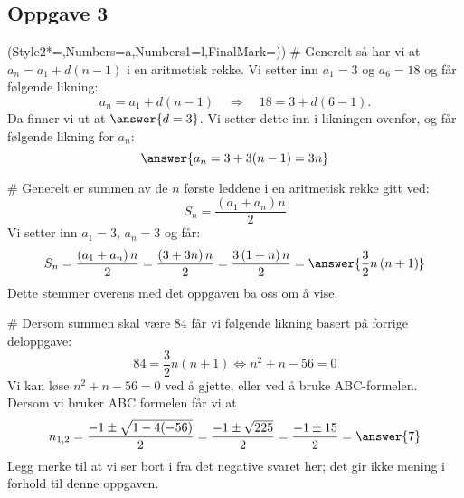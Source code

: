 \subsection*{Oppgave 3}
\begin{easylist}[enumerate]
	\ListProperties(Style2*=,Numbers=a,Numbers1=l,FinalMark={)})
	# Generelt så har vi at $a_n = a_1 + d(n-1)$ i en aritmetisk rekke. Vi setter inn $a_1 = 3$ og $a_6 = 18$ og
	får følgende likning:
	\begin{equation*}
		a_n = a_1 + d(n-1) \quad \Rightarrow \quad 18 = 3 + d(6-1).
	\end{equation*}
	Da finner vi ut at $\answer{d = 3}$. Vi setter dette inn i likningen ovenfor, og får følgende likning for $a_n$:
	\begin{equation*}
		\answer{a_n = 3 + 3(n-1) = 3n}
	\end{equation*}
	
	# Generelt er summen av de $n$ første leddene i en aritmetisk rekke gitt ved:
	\begin{equation*}
		S_n = \frac{\left(a_1 + a_n\right)n}{2}
	\end{equation*}
	Vi setter inn $a_1 = 3$, $a_n = 3$ og får:
	\begin{equation*}
		S_n = \frac{\left(a_1 + a_n\right)n}{2} = \frac{\left(3 + 3n\right)n}{2} = 
		\frac{3\left(1 + n\right)n}{2} = \answer{\frac{3}{2} n \left(n+1\right)}
	\end{equation*}
	Dette stemmer overens med det oppgaven ba oss om å vise.
	
	# Dersom summen skal være $84$ får vi følgende likning basert på forrige deloppgave:
	\begin{equation*}
		84 = \frac{3}{2} n \left(n+1\right) \Leftrightarrow n^2 + n - 56 = 0
	\end{equation*}
	Vi kan løse $n^2 + n - 56 = 0$ ved å gjette, eller ved å bruke ABC-formelen. Dersom vi bruker ABC formelen får vi at
	\begin{equation*}
		n_{1,2} = \frac{-1 \pm \sqrt{1 - 4 (-56)}}{2} = \frac{-1 \pm \sqrt{225}}{2} = 
		\frac{-1 \pm 15}{2} = \answer{7}
	\end{equation*}
	Legg merke til at vi ser bort i fra det negative svaret her; det gir ikke mening i forhold til denne oppgaven.
\end{easylist}

